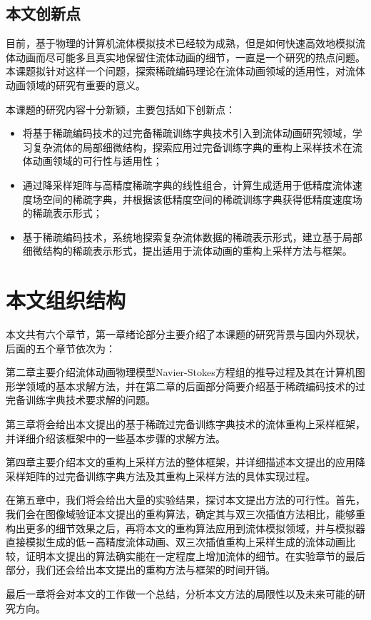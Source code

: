 \subsection{本文创新点}

目前，基于物理的计算机流体模拟技术已经较为成熟，但是如何快速高效地模拟流体动画而尽可能多且真实地保留住流体动画的细节，一直是一个研究的热点问题。本课题拟针对这样一个问题，探索稀疏编码理论在流体动画领域的适用性，对流体动画领域的研究有重要的意义。

本课题的研究内容十分新颖，主要包括如下创新点：
\begin{itemize}
\item 将基于稀疏编码技术的过完备稀疏训练字典技术引入到流体动画研究领域，学习复杂流体的局部细微结构，探索应用过完备训练字典的重构上采样技术在流体动画领域的可行性与适用性；
\item 通过降采样矩阵与高精度稀疏字典的线性组合，计算生成适用于低精度流体速度场空间的稀疏字典，并根据该低精度空间的稀疏训练字典获得低精度速度场的稀疏表示形式；
\item 基于稀疏编码技术，系统地探索复杂流体数据的稀疏表示形式，建立基于局部细微结构的稀疏表示形式，提出适用于流体动画的重构上采样方法与框架。
\end{itemize}

\section{本文组织结构}
\label{sec:orgnization}

本文共有六个章节，第一章绪论部分主要介绍了本课题的研究背景与国内外现状，后面的五个章节依次为：

第二章主要介绍流体动画物理模型Navier-Stokes方程组的推导过程及其在计算机图形学领域的基本求解方法，并在第二章的后面部分简要介绍基于稀疏编码技术的过完备训练字典技术要求解的问题。

第三章将会给出本文提出的基于稀疏过完备训练字典技术的流体重构上采样框架，并详细介绍该框架中的一些基本步骤的求解方法。

第四章主要介绍本文的重构上采样方法的整体框架，并详细描述本文提出的应用降采样矩阵的过完备训练字典方法及其重构上采样方法的具体实现过程。

在第五章中，我们将会给出大量的实验结果，探讨本文提出方法的可行性。首先，我们会在图像域验证本文提出的重构算法，确定其与双三次插值方法相比，能够重构出更多的细节效果之后，再将本文的重构算法应用到流体模拟领域，并与模拟器直接模拟生成的低－高精度流体动画、双三次插值重构上采样生成的流体动画比较，证明本文提出的算法确实能在一定程度上增加流体的细节。在实验章节的最后部分，我们还会给出本文提出的重构方法与框架的时间开销。

最后一章将会对本文的工作做一个总结，分析本文方法的局限性以及未来可能的研究方向。

